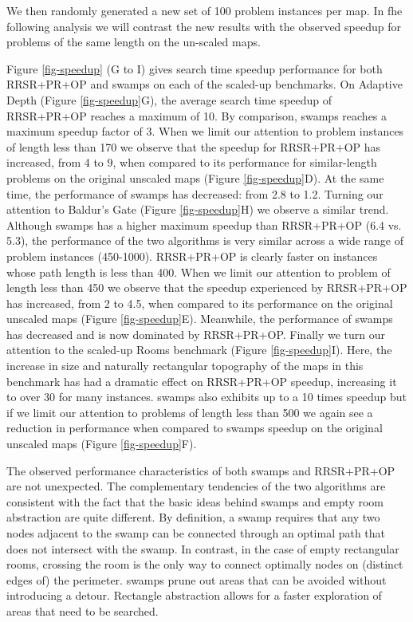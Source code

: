We then randomly generated a new set of 100 problem instances per map.
In fhe following analysis we will contrast the new
results with the observed speedup for problems of the same length on the un-scaled maps.
\par
Figure \ref{fig-speedup} (G to I) gives search time speedup performance for both RRSR+PR+OP and swamps
on each of the scaled-up benchmarks.
On Adaptive Depth (Figure \ref{fig-speedup}G), the average search time speedup of RRSR+PR+OP reaches a maximum of 10. 
By comparison, swamps reaches a maximum speedup factor of 3.
When we limit our attention to problem instances of length less than 170 we observe that the speedup 
for RRSR+PR+OP has increased, from 4 to 9, when compared to its performance for similar-length problems on the original 
unscaled maps (Figure \ref{fig-speedup}D). 
At the same time, the performance of swamps has decreased: from 2.8 to 1.2.
Turning our attention to Baldur's Gate (Figure \ref{fig-speedup}H) we observe a similar trend.
Although swamps has a higher maximum speedup than RRSR+PR+OP (6.4 vs. 5.3), the performance of the two 
algorithms is very similar across a wide range of problem instances (450-1000).
RRSR+PR+OP is clearly faster on instances whose path length is less than 400.
When we limit our attention to problem of length less than 450 we observe that the speedup experienced by
RRSR+PR+OP has increased, from 2 to 4.5, when compared to its performance on the original unscaled maps
(Figure \ref{fig-speedup}E).
Meanwhile, the performance of swamps has decreased and is now dominated by RRSR+PR+OP.
Finally we turn our attention to the scaled-up Rooms benchmark (Figure \ref{fig-speedup}I).
Here, the increase in size and naturally rectangular topography of the maps in this benchmark
has had a dramatic effect on RRSR+PR+OP speedup, increasing it to over 30 for many instances.
swamps also exhibits up to a 10 times speedup but if we limit our attention to problems of
length less than 500 we again see a reduction in performance when compared to swamps speedup
on the original unscaled maps (Figure \ref{fig-speedup}F). 
\par
The observed performance characteristics of both swamps and RRSR+PR+OP
are not unexpected.
The complementary tendencies of the two algorithms
are consistent with the fact that 
the basic ideas behind swamps and empty room abstraction are quite different.
By definition, a swamp requires that any two nodes adjacent to the swamp
can be connected through an optimal path that does not intersect with the swamp.
In contrast, in the case of empty rectangular rooms, 
crossing the room is the only way to connect optimally nodes on (distinct edges of) the perimeter.
swamps prune out areas that can be avoided without introducing a detour.
Rectangle abstraction allows for a faster exploration of areas that need to be searched.

